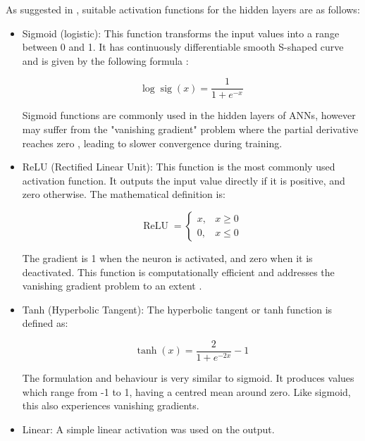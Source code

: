 As suggested in \cite{Marian2022}, suitable activation functions for the hidden layers are as follows:

\begin{itemize}
	\item Sigmoid (logistic): This function transforms the input values into a range between 0 and 1. It has continuously differentiable smooth S-shaped curve and is given by the following formula \cite{Han1995}:
	
	\begin{equation}\label{Logistic sigmoid}
		\log \operatorname{sig}(x)=\frac{1}{1+e^{-x}}
	\end{equation} 
	
	Sigmoid functions are commonly used in the hidden layers of ANNs, however may suffer from the "vanishing gradient" problem where the partial derivative reaches zero \cite{Sharma2020}, leading to slower convergence during training.
	
	\item ReLU (Rectified Linear Unit): This function is the most commonly used activation function. It outputs the input value directly if it is positive, and zero otherwise. The mathematical definition is:
	
	\begin{equation}\label{ReLU}
		\operatorname{ReLU}= \begin{cases}x, & x \geq 0 \\ 0, & x \leq 0\end{cases}
	\end{equation}
	
	The gradient is 1 when the neuron is activated, and zero when it is deactivated. This function is computationally efficient and addresses the vanishing gradient problem to an extent \cite{Sharma2020}.
	
	\item Tanh (Hyperbolic Tangent): The hyperbolic tangent or tanh function is defined as:
	
	\begin{equation}\label{Hyperbolic tangent}
		\tanh (x)=\frac{2}{1+e^{-2 x}}-1
	\end{equation}
	
	The formulation and behaviour is very similar to sigmoid. It produces values which range from -1 to 1, having a centred mean around zero. Like sigmoid, this also experiences vanishing gradients.
	
	\item Linear: A simple linear activation was used on the output.
	
\end{itemize}

